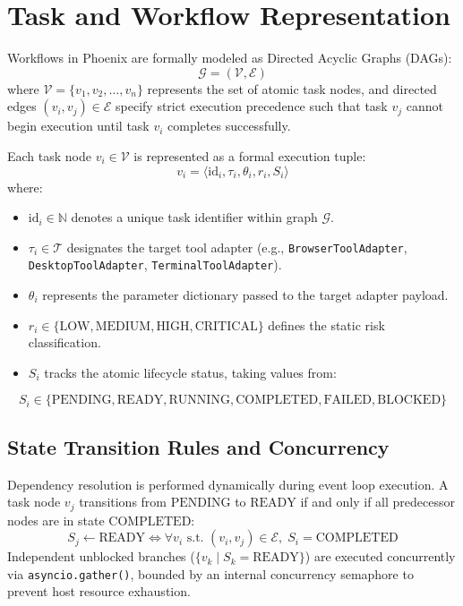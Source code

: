 \documentclass[conference]{IEEEtran}
\begin{document}
\section{Task and Workflow Representation}
\label{sec:dag_representation}
Workflows in Phoenix are formally modeled as Directed Acyclic Graphs (DAGs):
\begin{equation}
\mathcal{G} = (\mathcal{V}, \mathcal{E})
\end{equation}
where $\mathcal{V} = \{v_1, v_2, \dots, v_n\}$ represents the set of atomic task nodes, and directed edges $(v_i, v_j) \in \mathcal{E}$ specify strict execution precedence such that task $v_j$ cannot begin execution until task $v_i$ completes successfully.

Each task node $v_i \in \mathcal{V}$ is represented as a formal execution tuple:
\begin{equation}
v_i = \langle \text{id}_i, \tau_i, \theta_i, r_i, S_i \rangle
\end{equation}
where:
\begin{itemize}
    \item $\text{id}_i \in \mathbb{N}$ denotes a unique task identifier within graph $\mathcal{G}$.
    \item $\tau_i \in \mathcal{T}$ designates the target tool adapter (e.g., \texttt{BrowserToolAdapter}, \texttt{DesktopToolAdapter}, \texttt{TerminalToolAdapter}).
    \item $\theta_i$ represents the parameter dictionary passed to the target adapter payload.
    \item $r_i \in \{\text{LOW}, \text{MEDIUM}, \text{HIGH}, \text{CRITICAL}\}$ defines the static risk classification.
    \item $S_i$ tracks the atomic lifecycle status, taking values from:
\end{itemize}
\begin{equation}
S_i \in \{\text{PENDING}, \text{READY}, \text{RUNNING}, \text{COMPLETED}, \text{FAILED}, \text{BLOCKED}\}
\end{equation}

\subsection{State Transition Rules and Concurrency}
Dependency resolution is performed dynamically during event loop execution. A task node $v_j$ transitions from $\text{PENDING}$ to $\text{READY}$ if and only if all predecessor nodes are in state $\text{COMPLETED}$:
\begin{equation}
S_j \leftarrow \text{READY} \iff \forall v_i \text{ s.t. } (v_i, v_j) \in \mathcal{E}, \; S_i = \text{COMPLETED}
\end{equation}
Independent unblocked branches ($\{v_k \mid S_k = \text{READY}\}$) are executed concurrently via \texttt{asyncio.gather()}, bounded by an internal concurrency semaphore to prevent host resource exhaustion.
\end{document}
